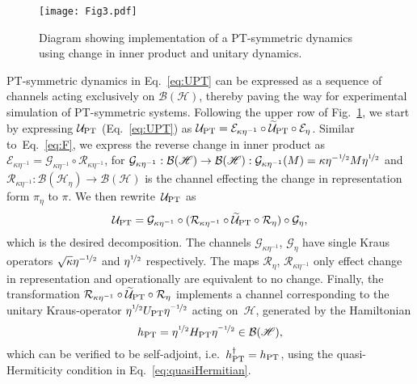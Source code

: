 \documentclass[amsmath,amssymb,aps,pra,superscriptaddress,twocolumn]{revtex4-2}
\begin{document}
\begin{figure}
\begin{center}
\texttt{[image: Fig3.pdf]}
\end{center}
\caption{Diagram showing implementation of a PT-symmetric dynamics using change in inner product and unitary dynamics.}
\label{fig:PTdynamics}
\end{figure}

PT-symmetric dynamics in Eq.~\eqref{eq:UPT} can be expressed as a sequence of channels 
acting exclusively on $\mathcal{B}(\mathscr{H})$, thereby paving the way for experimental simulation 
of PT-symmetric systems.
Following the upper row of Fig.~\ref{fig:PTdynamics}, 
we start by expressing $\mathcal{U}_{\rm{PT}}$ (Eq.~\eqref{eq:UPT})
as  $\mathcal{U}_{\rm{PT}}= \mathcal{E}_{\kappa \eta^{-1}} \circ  \widetilde{\mathcal{U}}_{\rm{PT}} \circ \mathcal{E}_\eta$.
Similar to~Eq.\ \eqref{eq:F},
we express the reverse change in inner product as 
$\mathcal{E}_{\kappa\eta^{-1}}= \mathcal{G}_{\kappa\eta^{-1}}\circ \mathcal{R}_{\kappa\eta^{-1}}$,
for  $\mathcal{G}_{\kappa\eta^{-1}}: \mathcal{B}(\mathscr{H})\to \mathcal{B}(\mathscr{H}): 
\mathcal{G}_{\kappa\eta^{-1}}(M) = \kappa \eta^{-\nicefrac{1}{2}}M\eta^{\nicefrac{1}{2}} $ and
$\mathcal{R}_{\kappa\eta^{-1}}: \mathcal{B}(\mathscr{H}_{\eta})\to \mathcal{B}(\mathscr{H})$ is the 
channel effecting the change in representation form $\pi_\eta$ to $\pi$.
We then rewrite~$\mathcal{U}_{\rm{PT}}$ as
\begin{equation}\label{eq:PTUnitaryoperational}
    \mathcal{U}_{\rm{PT}}= {\mathcal{G}}_{\kappa \eta^{-1}} \circ (\mathcal{R}_{\kappa\eta^{-1}} \circ \widetilde{\mathcal{U}}_{\rm{PT}} \circ \mathcal{R}_{\eta})\circ \mathcal{G}_\eta,
\end{equation}
which is the desired decomposition. The channels ${\mathcal{G}}_{\kappa \eta^{-1}}$, $ \mathcal{G}_\eta$ have 
single Kraus operators $\sqrt{\kappa}\eta^{-\nicefrac{1}{2}}$ and $\eta^{\nicefrac{1}{2}}$ respectively.
The maps $\mathcal{R}_{\eta}$,  $\mathcal{R}_{\kappa\eta^{-1}}$
only effect change in representation and operationally are equivalent to no change. 
Finally, the transformation $\mathcal{R}_{\kappa\eta^{-1}} \circ \widetilde{\mathcal{U}}_{\rm{PT}} \circ \mathcal{R}_{\eta}$
implements a channel 
corresponding to the unitary Kraus-operator $\eta^{\nicefrac{1}{2}}U_{\rm PT}\eta^{\nicefrac{-1}{2}}$ acting
on~$\mathscr{H}$, generated by the Hamiltonian 
\begin{equation}\label{eq:selfadjointHPT}
    h_{\rm PT} = \eta^{\nicefrac{1}{2}}H_{\rm PT}\eta^{\nicefrac{-1}{2}} \in \mathcal{B}(\mathscr{H}),
\end{equation}
which can be verified to be self-adjoint, i.e.\ $h_{\rm PT}^\dagger = h_{\rm PT}$, 
using the quasi-Hermiticity condition in Eq.~\eqref{eq:quasiHermitian}.
\end{document}
